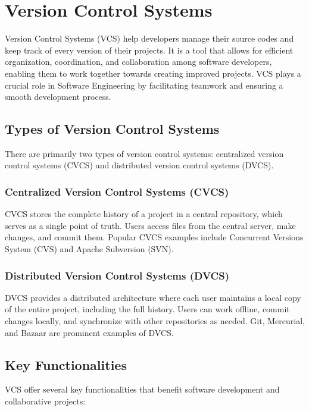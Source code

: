 \section*{Version Control Systems}

Version Control Systems (VCS) help developers manage their source codes and keep track of every version of their projects. It is a tool that allows for efficient organization, coordination, and collaboration among software developers, enabling them to work together towards creating improved projects. VCS plays a crucial role in Software Engineering by facilitating teamwork and ensuring a smooth development process.\cite{zolkifli2018version}

\subsection*{Types of Version Control Systems}

There are primarily two types of version control systems: centralized version control systems (CVCS) and distributed version control systems (DVCS).

\subsubsection*{Centralized Version Control Systems (CVCS)}
CVCS stores the complete history of a project in a central repository, which serves as a single point of truth. Users access files from the central server, make changes, and commit them. Popular CVCS examples include Concurrent Versions System (CVS) and Apache Subversion (SVN).

\subsubsection*{Distributed Version Control Systems (DVCS)}
DVCS provides a distributed architecture where each user maintains a local copy of the entire project, including the full history. Users can work offline, commit changes locally, and synchronize with other repositories as needed. Git, Mercurial, and Bazaar are prominent examples of DVCS.

\subsection*{Key Functionalities}

VCS offer several key functionalities that benefit software development and collaborative projects:

